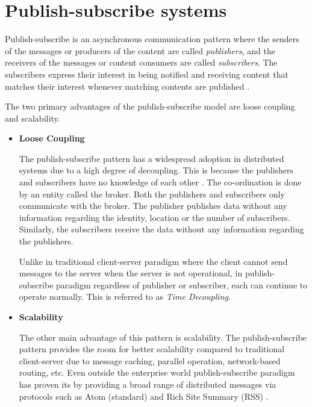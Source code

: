 \section{Publish-subscribe systems}

Publish-subscribe is an asynchronous communication pattern where the senders of the messages or producers of the content are called \textit{publishers}, and the receivers of the messages or content consumers are called \textit {subscribers}. The subscribers express their interest in being notified and receiving content that matches their interest whenever matching contents are published \parencite{Pietzuch:2002:HDE:646854.708058}. 

The two primary advantages of the publish-subscribe model are loose coupling and scalability.

\begin{itemize}
\item[]\textbf{Loose Coupling}

The publish-subscribe pattern has a widespread adoption in distributed systems due to a high degree of decoupling. This is because the publishers and subscribers have no knowledge of each other \parencite{Cheung:2010:LBC:1880018.1880020}. The co-ordination is done by an entity called the broker. Both the publishers and subscribers only communicate with the broker. The publisher publishes data without any information regarding the identity, location or the number of subscribers. Similarly, the subscribers receive the data without any information regarding the publishers. 

Unlike in traditional client-server paradigm where the client cannot send messages to the server when the server is not operational, in publish-subscribe paradigm regardless of publisher or subscriber, each can continue to operate normally. This is referred to as \textit {Time Decoupling}.   

\item[]\textbf{Scalability}

The other main advantage of this pattern is scalability. The publish-subscribe pattern provides the room for better scalability compared to traditional client-server due to message caching, parallel operation, network-based routing, etc. Even outside the enterprise world publish-subscribe paradigm has proven its by providing a broad range of distributed messages via protocols such as Atom (standard) and Rich Site Summary (RSS) \parencite{pub_sub_wiki}.

\end{itemize}

